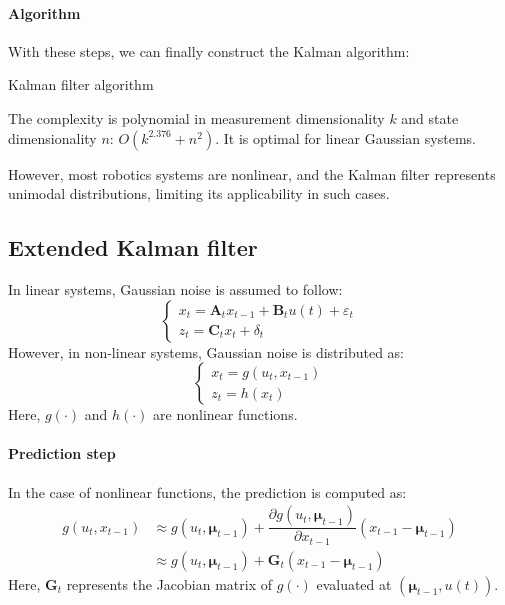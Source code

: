 \paragraph*{Algorithm} 
With these steps, we can finally construct the Kalman algorithm:
\begin{algorithm}[H]
    \caption{Kalman filter algorithm}
        \begin{algorithmic}[1]
             
              
            \State{}
        \end{algorithmic}
\end{algorithm}
The complexity is polynomial in measurement dimensionality $k$ and state dimensionality $n$: $O(k^{2.376} + n^2)$.
It is optimal for linear Gaussian systems.

However, most robotics systems are nonlinear, and the Kalman filter represents unimodal distributions, limiting its applicability in such cases.

\subsection{Extended Kalman filter}
In linear systems, Gaussian noise is assumed to follow:
\[\begin{cases}
    x_t=\mathbf{A}_tx_{t-1}+\mathbf{B}_tu(t)+\varepsilon_t \\
    z_t=\mathbf{C}_tx_t+\delta_t
\end{cases}\]
However, in non-linear systems, Gaussian noise is distributed as:
\[\begin{cases}
    x_t=g(u_t,x_{t-1}) \\
    z_t=h(x_t)
\end{cases}\]
Here, $g(\cdot)$ and $h(\cdot)$ are nonlinear functions. 

\paragraph*{Prediction step}
In the case of nonlinear functions, the prediction is computed as:
\begin{align*}
    g(u_t,x_{t-1})  &\approx g(u_t,\boldsymbol{\mu}_{t-1})+\dfrac{\partial g(u_t,\boldsymbol{\mu}_{t-1})}{\partial x_{t-1}} (x_{t-1}-\boldsymbol{\mu}_{t-1}) \\
                    &\approx g(u_t,\boldsymbol{\mu}_{t-1})+\mathbf{G}_t(x_{t-1}-\boldsymbol{\mu}_{t-1})
\end{align*} 
Here, $\mathbf{G}_t$ represents the Jacobian matrix of $g(\cdot)$ evaluated at $\left(\boldsymbol{\mu}_{t-1},u(t)\right)$. 

